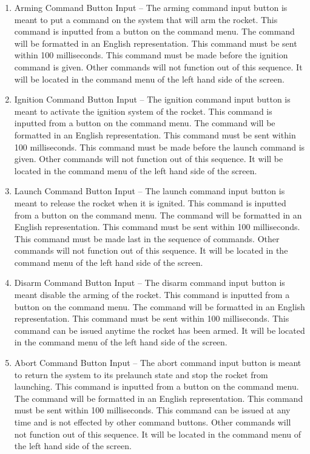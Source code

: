 \documentclass[10pt,draftclsnofoot,onecolumn]{IEEEtran}
\begin{document}
\begin{enumerate}
\item Arming Command Button Input –
The arming command input button is meant to put a command on the system that will arm the rocket. This command is inputted from a button on the command menu. The command will be formatted in an English representation.  This command must be sent within 100 milliseconds. This command must be made before the ignition command is given. Other commands will not function out of this sequence. It will be located in the command menu of the left hand side of the screen.
\item Ignition Command Button Input –
The ignition command input button is meant to activate the ignition system of the rocket. This command is inputted from a button on the command menu. The command will be formatted in an English representation.  This command must be sent within 100 milliseconds. This command must be made before the launch command is given. Other commands will not function out of this sequence. It will be located in the command menu of the left hand side of the screen.
\item Launch Command Button Input –
The launch command input button is meant to release the rocket when it is ignited. This command is inputted from a button on the command menu. The command will be formatted in an English representation.  This command must be sent within 100 milliseconds. This command must be made last in the sequence of commands. Other commands will not function out of this sequence. It will be located in the command menu of the left hand side of the screen.
\item Disarm Command Button Input –
The disarm command input button is meant disable the arming of the rocket. This command is inputted from a button on the command menu. The command will be formatted in an English representation.  This command must be sent within 100 milliseconds. This command can be issued anytime the rocket has been armed. It will be located in the command menu of the left hand side of the screen.
\item Abort Command Button Input –
The abort command input button is meant to return the system to its prelaunch state and stop the rocket from launching. This command is inputted from a button on the command menu. The command will be formatted in an English representation.  This command must be sent within 100 milliseconds. This command can be issued at any time and is not effected by other command buttons. Other commands will not function out of this sequence. It will be located in the command menu of the left hand side of the screen.

\end{enumerate}
\end{document}
